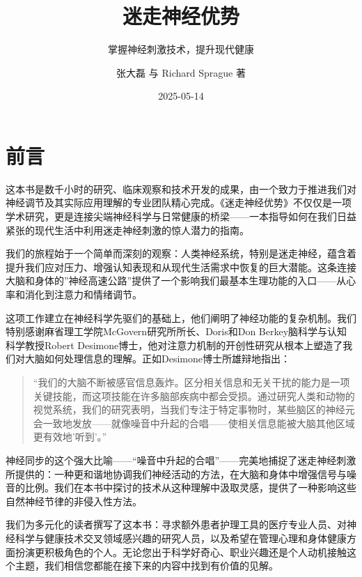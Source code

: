 \documentclass[
  Letterpaper,
]{scrbook}
\title{迷走神经优势}
\subtitle{掌握神经刺激技术，提升现代健康}
\author{张大磊 与 Richard Sprague 著}
\date{2025-05-14}
\renewcommand*\contentsname{目录}
\newcommand\contentsname{目录}
\begin{document}
\frontmatter
\maketitle

\renewcommand*\contentsname{目录}
{
\setcounter{tocdepth}{2}
\tableofcontents
}

\mainmatter
{}

\chapter*{前言}\label{ux524dux8a00}


这本书是数千小时的研究、临床观察和技术开发的成果，由一个致力于推进我们对神经调节及其实际应用理解的专业团队精心完成。《迷走神经优势》不仅仅是一项学术研究，更是连接尖端神经科学与日常健康的桥梁------一本指导如何在我们日益紧张的现代生活中利用迷走神经刺激的惊人潜力的指南。

我们的旅程始于一个简单而深刻的观察：人类神经系统，特别是迷走神经，蕴含着提升我们应对压力、增强认知表现和从现代生活需求中恢复的巨大潜能。这条连接大脑和身体的''神经高速公路''提供了一个影响我们最基本生理功能的入口------从心率和消化到注意力和情绪调节。

这项工作建立在神经科学先驱们的基础上，他们阐明了神经功能的复杂机制。我们特别感谢麻省理工学院McGovern研究所所长、Doris和Don
Berkey脑科学与认知科学教授Robert
Desimone博士，他对注意力机制的开创性研究从根本上塑造了我们对大脑如何处理信息的理解。正如Desimone博士所雄辩地指出：

\begin{quote}
``我们的大脑不断被感官信息轰炸。区分相关信息和无关干扰的能力是一项关键技能，而这项技能在许多脑部疾病中都会受损。通过研究人类和动物的视觉系统，我们的研究表明，当我们专注于特定事物时，某些脑区的神经元会一致地发放------就像噪音中升起的合唱------使相关信息能被大脑其他区域更有效地'听到'。''
\end{quote}

神经同步的这个强大比喻------``噪音中升起的合唱''------完美地捕捉了迷走神经刺激所提供的：一种更和谐地协调我们神经活动的方法，在大脑和身体中增强信号与噪音的比例。我们在本书中探讨的技术从这种理解中汲取灵感，提供了一种影响这些自然神经节律的非侵入性方法。

我们为多元化的读者撰写了这本书：寻求额外患者护理工具的医疗专业人员、对神经科学与健康技术交叉领域感兴趣的研究人员，以及希望在管理心理和身体健康方面扮演更积极角色的个人。无论您出于科学好奇心、职业兴趣还是个人动机接触这个主题，我们相信您都能在接下来的内容中找到有价值的见解。
\end{document}
